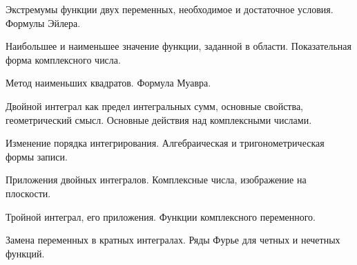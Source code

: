 \documentclass[
	14pt,
	a4paper,
	]
	{scrartcl}
\begin{document}
\vfill
\z Экстремумы функции двух переменных, необходимое и достаточное условия.
 \vfill
\z Формулы Эйлера.
 \vfill

\vfill

\newpage


\shapk
{}
\setcounter{zad}{0}

\vfill
\z Наибольшее и наименьшее значение функции, заданной в области.
 \vfill
\z Показательная форма комплексного числа.
 \vfill

\vfill

\newpage


\shapk
{}
\setcounter{zad}{0}

\vfill
\z Метод наименьших квадратов.
 \vfill
\z Формула Муавра.
 \vfill

\vfill

\newpage


\shapk
{}
\setcounter{zad}{0}

\vfill
\z Двойной интеграл как предел интегральных сумм, основные свойства, геометрический смысл.
 \vfill
\z Основные действия над комплексными числами.
 \vfill

\vfill

\newpage


\shapk
{}
\setcounter{zad}{0}

\vfill
\z Изменение порядка интегрирования.
 \vfill
\z Алгебраическая и тригонометрическая формы записи.
 \vfill

\vfill

\newpage


\shapk
{}
\setcounter{zad}{0}

\vfill
\z Приложения двойных интегралов.
 \vfill
\z Комплексные числа, изображение на плоскости.
 \vfill

\vfill

\newpage


\shapk
{}
\setcounter{zad}{0}

\vfill
\z Тройной интеграл, его приложения.
 \vfill
\z Функции комплексного переменного.
 \vfill

\vfill

\newpage


\shapk
{}
\setcounter{zad}{0}

\vfill
\z Замена переменных в кратных интегралах.
 \vfill
\z Ряды Фурье для четных и нечетных функций.
 \vfill
\end{document}
